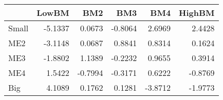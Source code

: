 \begin{tabular}{lrrrrr}
\toprule
{} &   LowBM &     BM2 &     BM3 &     BM4 &  HighBM \\
\midrule
Small & -5.1337 &  0.0673 & -0.8064 &  2.6969 &  2.4428 \\
ME2   & -3.1148 &  0.0687 &  0.8841 &  0.8314 &  0.1624 \\
ME3   & -1.8802 &  1.1389 & -0.2232 &  0.9655 &  0.3914 \\
ME4   &  1.5422 & -0.7994 & -0.3171 &  0.6222 & -0.8769 \\
Big   &  4.1089 &  0.1762 &  0.1281 & -3.8712 & -1.9773 \\
\bottomrule
\end{tabular}
